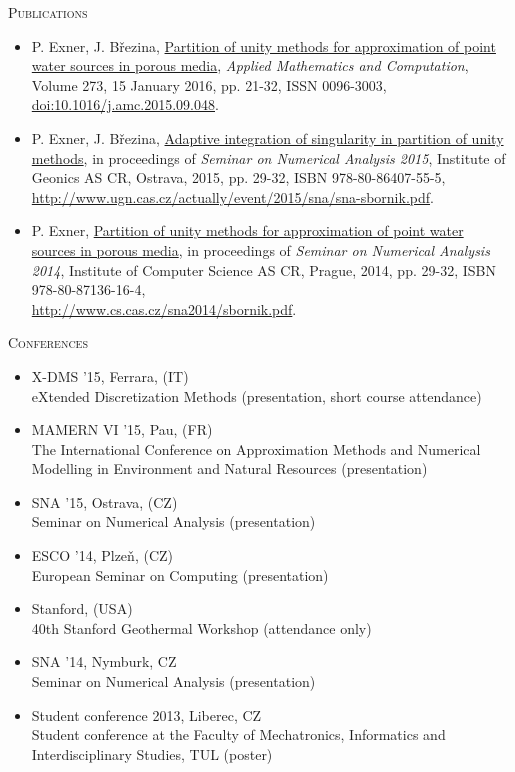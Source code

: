 \documentclass[dvipsnames,FM,Dis]{tulthesis}
\begin{document}
\large\textsc{Publications}
\begin{itemize}[label={}]
\item
P. Exner, J. B{\v r}ezina, \href{http://www.sciencedirect.com/science/article/pii/S0096300315012862}{Partition of unity methods for approximation of point water sources in porous media},
\emph{Applied Mathematics and Computation}, Volume 273, 15 January 2016, pp. 21-32, ISSN 0096-3003, \href{http://dx.doi.org/10.1016/j.amc.2015.09.048}{doi:10.1016/j.amc.2015.09.048}.

\item
P. Exner, J. B{\v r}ezina, \href{http://www.ugn.cas.cz/actually/event/2015/sna/sna-sbornik.pdf}{Adaptive integration of singularity in partition of unity methods},
in proceedings of \emph{Seminar on Numerical Analysis 2015}, Institute of Geonics AS CR, Ostrava, 2015, pp. 29-32, ISBN 978-80-86407-55-5, \\
\href{http://www.ugn.cas.cz/actually/event/2015/sna/sna-sbornik.pdf}{http://www.ugn.cas.cz/actually/event/2015/sna/sna-sbornik.pdf}.

\item
P. Exner, \href{http://www.cs.cas.cz/sna2014/sbornik.pdf}{Partition of unity methods for approximation of point water sources in porous media},
in proceedings of \emph{Seminar on Numerical Analysis 2014}, Institute of Computer Science AS CR, Prague, 2014, pp. 29-32, ISBN 978-80-87136-16-4, \\
\href{http://www.cs.cas.cz/sna2014/sbornik.pdf}{http://www.cs.cas.cz/sna2014/sbornik.pdf}.


\end{itemize}
%
\vspace{0.5cm}
%
\large\textsc{Conferences}
%
\begin{itemize}[label={}]
\item X-DMS '15, Ferrara, (IT) \\ eXtended Discretization Methods (presentation, short course attendance)
\item MAMERN VI '15, Pau, (FR) \\ The International Conference on Approximation Methods and Numerical Modelling in Environment and Natural Resources (presentation)
\item SNA '15, Ostrava, (CZ) \\ Seminar on Numerical Analysis (presentation)
\item ESCO '14, Plze{\v n}, (CZ) \\ European Seminar on Computing (presentation)
\item Stanford, (USA) \\ 40th Stanford Geothermal Workshop (attendance only)
\item SNA '14, Nymburk, CZ \\ Seminar on Numerical Analysis (presentation)
\item Student conference 2013, Liberec, CZ \\ Student conference at the Faculty of Mechatronics, Informatics and Interdisciplinary Studies, TUL (poster)
\end{itemize}
\end{document}

